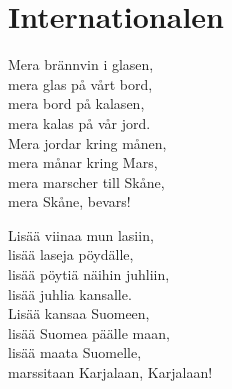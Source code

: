\section{Internationalen}

Mera brännvin i glasen,\\
mera glas på vårt bord,\\
mera bord på kalasen,\\ 
mera kalas på vår jord.\\
Mera jordar kring månen,\\ 
mera månar kring Mars,\\
mera marscher till Skåne,\\
mera Skåne, bevars!

Lisää viinaa mun lasiin,\\
lisää laseja pöydälle,\\
lisää pöytiä näihin juhliin,\\
lisää juhlia kansalle.\\
Lisää kansaa Suomeen,\\
lisää Suomea päälle maan,\\
lisää maata Suomelle,\\
marssitaan Karjalaan, Karjalaan!